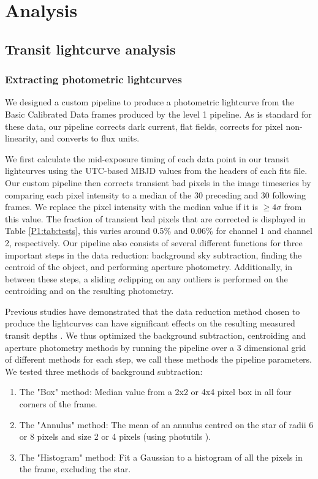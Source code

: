 \section{Analysis}
\label{P1:sec:Analysis}

\subsection{Transit lightcurve analysis}

\subsubsection{Extracting \spitzer photometric lightcurves}
\label{P1:subsec:photometry}

We designed a custom pipeline to produce a photometric lightcurve from the Basic Calibrated Data frames produced by the \spitzer level 1 pipeline. As is standard for these data, our pipeline corrects dark current, flat fields, corrects for pixel non-linearity, and converts to flux units.

We first calculate the mid-exposure timing of each data point in our transit lightcurves using the UTC-based MBJD values from the headers of each fits file. Our custom pipeline then corrects transient bad pixels in the image timeseries by comparing each pixel intensity to a median of the 30 preceding and 30 following frames. We replace the pixel intensity with the median value if it is $\geq4\sigma$ from this value. The fraction of transient bad pixels that are corrected is displayed in Table \ref{P1:tab:tests}, this varies around 0.5\% and 0.06\% for channel 1 and channel 2, respectively. Our pipeline also consists of several different functions for three important steps in the data reduction: background sky subtraction, finding the centroid of the object, and performing aperture photometry. Additionally, in between these steps, a sliding $\sigma$clipping on any outliers is performed on the centroiding and on the resulting photometry.

Previous studies have demonstrated that the data reduction method chosen to produce the lightcurves can have significant effects on the resulting measured transit depths \citep{Ingalls2016}. We thus optimized the background subtraction, centroiding and aperture photometry methods by running the pipeline over a 3 dimensional grid of different methods for each step, we call these methods the pipeline parameters. We tested three methods of background subtraction:
\begin{enumerate}
    \item The "Box" method: Median value from a 2x2 or 4x4 pixel box in all four corners of the frame.
    \item The "Annulus" method: The mean of an annulus centred on the star of radii 6 or 8 pixels and size 2 or 4 pixels (using photutils \cite{}).
    \item The "Histogram" method: Fit a Gaussian to a histogram of all the pixels in the frame, excluding the star.
\end{enumerate}

